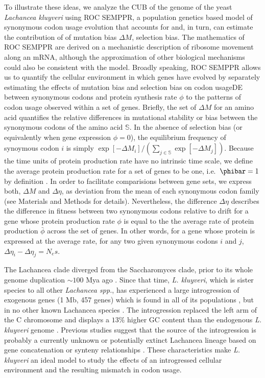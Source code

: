 \documentclass[doublespacing,linenumbers]{bmcart-modified}
\newcommand{\kluyveri}{\textit{L. kluyveri}\xspace}
\newcommand{\ROC}{ROC SEMPPR\xspace}
\newcommand{\GC}{GC content\xspace}
\newcommand{\DM}{\ensuremath{{\Delta M}}\xspace}
\newcommand{\DE}{\ensuremath{{\Delta \eta}}\xspace}
\newcommand{\Ne}{\ensuremath{N_e}\xspace}
\newcommand{\setS}{\ensuremath{\mathbb{S}}\xspace}
\newcommand{\barphi}{\ensuremath{\bar{\phi}}\xspace}
\begin{document}
To illustrate these ideas, we analyze the CUB of the genome of the yeast \emph{Lachancea kluyveri} using \ROC, a population genetics based model of synonymous codon usage evolution that accounts for and, in turn, can estimate the contribution of of mutation bias \DM, selection bias.
The mathematics of \ROC are derived on a mechanistic description of ribosome movement along an mRNA, although the approximation of other biological mechanisms could also be consistent with the model.
Broadly speaking, \ROC allows us to quantify the cellular environment in which genes have evolved by separately estimating the effects of mutation bias and selection bias on codon usageDE between synonymous codons and protein synthesis rate $\phi$ to the patterns of codon usage observed within a set of genes.
Briefly, the set of \DM for an amino acid quantifies the relative differences in mutational stability or bias between the synonymous codons of the amino acid \setS.
In the absence of selection bias (or equivalently when gene expression $\phi = 0$), the equilibrium frequency of synoymous codon $i$ is simply $\exp[-\DM_i]/\left(\sum_{j \in \setS}\exp[-\DM_j]\right)$.
Because the time units of protein production rate have no intrinsic time scale, we define the average protein production rate for a set of genes to be one, i.e.~$\phibar = 1$ by definition \citep{gilchrist2015}. 
In order to facilitate comparisions between gene sets, we express both, \DM and \DE, as deviation from the mean of each synonymous codon family (see Materials and Methods for details).
Nevertheless, the difference \DE describes the difference in fitness between two synonymous codons relative to drift for a gene whose protein production rate $\phi$ is equal to the the average rate of protein production $\barphi$ across the set of genes.
In other words, for a gene whose protein is expressed at the average rate, for any two given synonymous codons $i$ and $j$,  $\DE_i-\DE_j = \Ne s$.

The Lachancea clade diverged from the Saccharomyces clade, prior to its whole genome duplication $\sim 100$ Mya ago \citep{MHM2015,Beimforde2014}. 
Since that time, \kluyveri, which is sister species to all other \emph{Lachancea spp.},  has experienced a large introgression of exogenous genes (1 Mb, 457 genes) which is found in all of its populations \citep{payen2009,friedrich2015}, but in no other known Lachancea species \citep{vakirlis2016}.
The introgression replaced the left arm of the C chromosome and displays a $13 \%$ higher \GC than the endogenous \kluyveri genome \citep{payen2009, friedrich2015}.
Previous studies suggest that the source of the introgression is probably a currently unknown or potentially extinct Lachancea lineage based on gene concatenation or synteny relationships \citep{payen2009, friedrich2015, vakirlis2016, brion2017}.
These characteristics make \kluyveri an ideal model to study the effects of an introgressed cellular environment and the resulting mismatch in codon usage.
\end{document}
